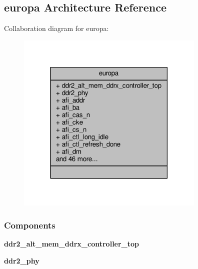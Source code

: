 \subsection{europa Architecture Reference}
\label{classddr2__controller__phy_1_1europa}


Collaboration diagram for europa\+:\nopagebreak
\begin{figure}[H]
\begin{center}
\leavevmode
\includegraphics[width=255pt]{d4/d83/classddr2__controller__phy_1_1europa__coll__graph}
\end{center}
\end{figure}
\subsubsection*{Components}
 \begin{DoxyCompactItemize}
\item 
{\bf ddr2\+\_\+alt\+\_\+mem\+\_\+ddrx\+\_\+controller\+\_\+top}  {\bfseries }  
\item 
{\bf ddr2\+\_\+phy}  {\bfseries }  
\end{DoxyCompactItemize}
